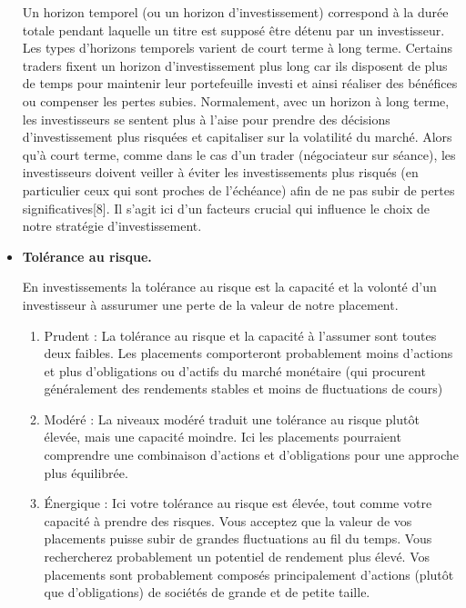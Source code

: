 \begin{itemize}
  Un horizon temporel (ou un horizon d'investissement) correspond à la
  durée totale pendant laquelle un titre est supposé être détenu par un
  investisseur. Les types d'horizons temporels varient de court terme à
  long terme. Certains traders fixent un horizon d'investissement plus
  long car ils disposent de plus de temps pour maintenir leur
  portefeuille investi et ainsi réaliser des bénéfices ou compenser les
  pertes subies. Normalement, avec un horizon à long terme, les
  investisseurs se sentent plus à l'aise pour prendre des décisions
  d'investissement plus risquées et capitaliser sur la volatilité du
  marché. Alors qu'à court terme, comme dans le cas d'un trader
  (négociateur sur séance), les investisseurs doivent veiller à éviter
  les investissements plus risqués (en particulier ceux qui sont proches
  de l'échéance) afin de ne pas subir de pertes significatives{[}8{]}.
  Il s'agit ici d'un facteurs crucial qui influence le choix de notre
  stratégie d'investissement.
\item
  \textbf{Tolérance au risque.}

  { En investissements la tolérance au risque est la capacité et la
  volonté d'un investisseur à assurumer une perte de la valeur de notre
  placement. }

  \begin{enumerate}
  \item
    Prudent : La tolérance au risque et la capacité à l'assumer sont
    toutes deux faibles. Les placements comporteront probablement moins
    d'actions et plus d'obligations ou d'actifs du marché monétaire (qui
    procurent généralement des rendements stables et moins de
    fluctuations de cours)
  \item
    Modéré : La niveaux modéré traduit une tolérance au risque plutôt
    élevée, mais une capacité moindre. Ici les placements pourraient
    comprendre une combinaison d'actions et d'obligations pour une
    approche plus équilibrée.
  \item
    Énergique : Ici votre tolérance au risque est élevée, tout comme
    votre capacité à prendre des risques. Vous acceptez que la valeur de
    vos placements puisse subir de grandes fluctuations au fil du temps.
    Vous rechercherez probablement un potentiel de rendement plus élevé.
    Vos placements sont probablement composés principalement d'actions
    (plutôt que d'obligations) de sociétés de grande et de petite
    taille.
  \end{enumerate}
\end{itemize}

